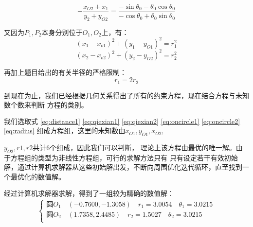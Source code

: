 \documentclass{cumcmthesis1}
\begin{document}
\begin{equation}
    -\frac{x_{O2}+x_1}{y_2+y_{O2}}=\frac{-\sin \theta_0-\theta_0 \cos \theta_0}{-\cos \theta_0+\theta_0 \sin \theta_0}
    \label{eq:qiexian2}
\end{equation}
\par
又因为$P_1,P_2$本身分别位于$O_1,O_2$上，有：
\begin{equation}
    (x_{1}-x_{o1})^2+(y_{1}-y_{O1})^2=r_1^2
    \label{eq:oncircle1}
\end{equation}
\begin{equation}
    (x_{2}-x_{o2})^2+(y_{2}-y_{O2})^2=r_2^2
    \label{eq:oncircle2}
\end{equation}
\par
再加上题目给出的有关半径的严格限制：
\begin{equation}
    r_1=2r_2
    \label{eq:radius}
\end{equation}
\par
到现在为止，我们已经根据几何关系得出了所有的约束方程，现在结合方程与未知数个数来判断
方程的类别。
\par
我们选取式 \eqref{eq:distance1} 
\eqref{eq:qiexian1}
\eqref{eq:qiexian2}
\eqref{eq:oncircle1}
\eqref{eq:oncircle2}
\eqref{eq:radius}
组成方程组，这里的未知数由$x_{O1},y_{O1},x_{O2},$  

\noindent
$y_{O2},r1,r2$共计6个组成，因此我们可以判断，
理论上该方程由最优的唯一解。由于方程组的类型为非线性方程组，可行的求解方法只有
只有设定若干有效初始解，通过计算机求解器从这些初始解出发，不断向周围优化迭代循环，直至找到一个最优化的数值解。
\par
经过计算机求解器求解，得到了一组较为精确的数值解：
\begin{align}
    \begin{cases}
        \text{圆}O_1 \quad (-0.7600,-1.3058) \quad r_1=3.0054 \quad \theta_1=3.0215\\
        \text{圆}O_2 \quad (1.7358,2.4485) \quad r_2=1.5027 \quad \theta_2=3.0215\\
    \end{cases}
\end{align}
\end{document}
